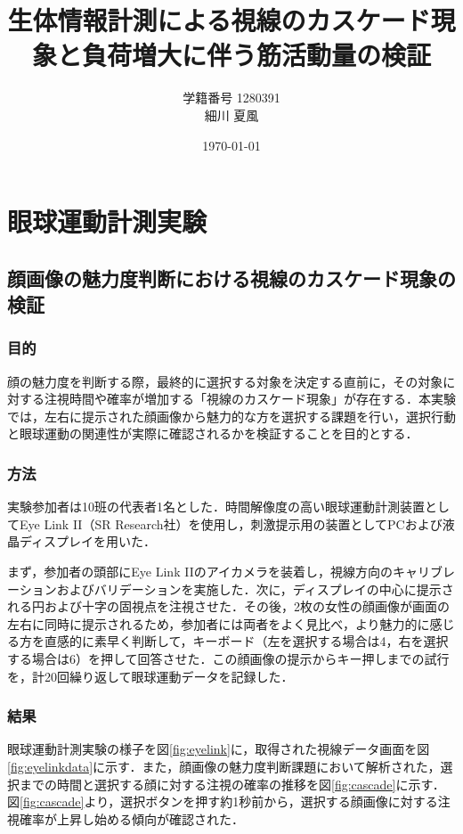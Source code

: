 \documentclass[paper=a4, fontsize=10pt]{jlreq}
\title{生体情報計測による視線のカスケード現象と負荷増大に伴う筋活動量の検証}
\author{学籍番号 1280391 \\ 細川 夏風}
\date{\today}
\begin{document}
\maketitle

\section{眼球運動計測実験}
\subsection{顔画像の魅力度判断における視線のカスケード現象の検証}
\subsubsection{目的}
顔の魅力度を判断する際，最終的に選択する対象を決定する直前に，その対象に対する注視時間や確率が増加する「視線のカスケード現象」が存在する\cite{bsd_eyemovement, tane_michimata}．本実験では，左右に提示された顔画像から魅力的な方を選択する課題を行い，選択行動と眼球運動の関連性が実際に確認されるかを検証することを目的とする．

\subsubsection{方法}
実験参加者は10班の代表者1名とした．時間解像度の高い眼球運動計測装置としてEye Link II（SR Research社）を使用し，刺激提示用の装置としてPCおよび液晶ディスプレイを用いた．

まず，参加者の頭部にEye Link IIのアイカメラを装着し，視線方向のキャリブレーションおよびバリデーションを実施した．次に，ディスプレイの中心に提示される円および十字の固視点を注視させた．その後，2枚の女性の顔画像が画面の左右に同時に提示されるため，参加者には両者をよく見比べ，より魅力的に感じる方を直感的に素早く判断して，キーボード（左を選択する場合は4，右を選択する場合は6）を押して回答させた．この顔画像の提示からキー押しまでの試行を，計20回繰り返して眼球運動データを記録した．

\subsubsection{結果}
眼球運動計測実験の様子を図\ref{fig:eyelink}に，取得された視線データ画面を図\ref{fig:eyelinkdata}に示す．また，顔画像の魅力度判断課題において解析された，選択までの時間と選択する顔に対する注視の確率の推移を図\ref{fig:cascade}に示す．図\ref{fig:cascade}より，選択ボタンを押す約1秒前から，選択する顔画像に対する注視確率が上昇し始める傾向が確認された．
\end{document}
